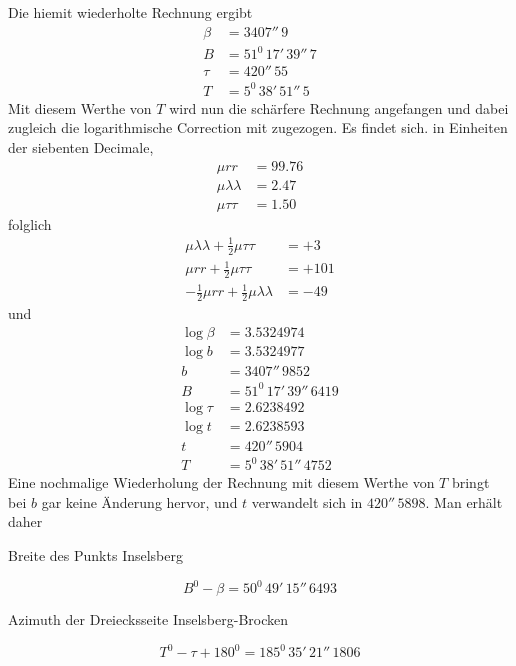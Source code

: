%
Die hiemit wiederholte Rechnung ergibt
\[
\begin{aligned}
\beta&=3407''\,9\\
B&=51^0\,17'\,39''\,7\\
\tau&=420''\,55\\
T&=5^0\,38'\,51''\,5
\end{aligned}
\]
Mit diesem Werthe von \(T\) wird nun die schärfere Rechnung angefangen und dabei zugleich die logarithmische Correction mit zugezogen. Es findet sich. in Einheiten der siebenten Decimale,
\[
\begin{aligned}
\mu rr&=99.76\\
\mu\lambda\lambda&=2.47\\
\mu\tau\tau&=1.50
\end{aligned}
\]
folglich
\[
\begin{aligned}
\mu\lambda\lambda+\tfrac12\mu\tau\tau&=+3\\
\mu rr+\tfrac12\mu\tau\tau&=+101\\
-\tfrac12\mu rr+\tfrac12\mu\lambda\lambda&=-49
\end{aligned}
\]
und
\[
\begin{aligned}
\log\beta&=3.5324974\\
\log b&=3.5324977\\
b&=3407''\,9852\\
B&=51^0\,17'\,39''\,6419\\
\log\tau&=2.6238492\\
\log t&=2.6238593\\
t&=420''\,5904\\
T&=5^0\,38'\,51''\,4752
\end{aligned}
\]
Eine nochmalige Wiederholung der Rechnung mit diesem Werthe von \(T\) bringt bei \(b\) gar keine Änderung hervor, und \(t\) verwandelt sich in \(420''\,5898\). Man erhält daher
\begin{center}Breite des Punkts Inselsberg\end{center}
\[
B^0-\beta=50^0\,49'\,15''\,6493
\]
\begin{center}Azimuth der Dreiecksseite Inselsberg-Brocken\end{center}
\[
T^0-\tau+180^0=185^0\,35'\,21''\,1806
\]
